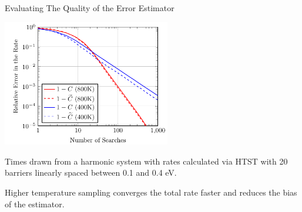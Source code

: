 \documentclass[onlymath]{beamer}
\begin{document}
\begin{frame}{Evaluating The Quality of the Error Estimator}

\begin{center}
\includegraphics[width=0.55\textwidth]{images/confidence-test.pdf}
\end{center}

Times drawn from a harmonic system with rates calculated via HTST with 20 barriers linearly spaced between 0.1 and 0.4 eV.

Higher temperature sampling converges the total rate faster and reduces the bias of the estimator.

\end{frame}
\end{document}
